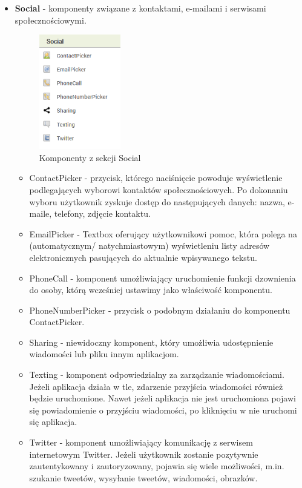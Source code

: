 \begin{itemize}
\item \textbf{Social} - komponenty związane z kontaktami, e-mailami i serwisami społecznościowymi.

\begin{figure}[H] 
\centering\includegraphics[height=5cm]{figures/components/social}
\caption{Komponenty z sekcji Social}
\end{figure}

\begin{itemize}
\item ContactPicker - przycisk, którego naciśnięcie powoduje wyświetlenie podlegających wyborowi kontaktów społecznościowych. Po dokonaniu wyboru użytkownik zyskuje dostęp do następujących danych: nazwa, e-maile, telefony, zdjęcie kontaktu.
\item EmailPicker - Textbox oferujący użytkownikowi pomoc, która polega na (automatycznym/ natychmiastowym) wyświetleniu listy adresów elektronicznych pasujących do aktualnie wpisywanego tekstu.
\item PhoneCall - komponent umożliwiający uruchomienie funkcji dzownienia do osoby, którą wcześniej ustawimy jako właściwość komponentu.
\item PhoneNumberPicker - przycisk o podobnym działaniu do komponentu ContactPicker.
\item Sharing - niewidoczny komponent, który umożliwia udostępnienie wiadomości lub pliku innym aplikacjom.
\item Texting - komponent odpowiedzialny za zarządzanie wiadomościami. Jeżeli aplikacja działa w tle, zdarzenie przyjścia wiadomości również będzie uruchomione. Nawet jeżeli aplikacja nie jest uruchomiona pojawi się powiadomienie o przyjściu wiadomości, po kliknięciu w nie uruchomi się aplikacja.
\item Twitter - komponent umożliwiający komunikację z serwisem internetowym Twitter. Jeżeli użytkownik zostanie pozytywnie zautentykowany i zautoryzowany, pojawia się wiele możliwości, m.in. szukanie tweetów, wysyłanie tweetów, wiadomości, obrazków.
\end{itemize}


\end{itemize}

